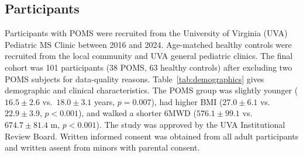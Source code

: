 \documentclass{article}
\begin{document}
\subsection{Participants}\label{sec:participants}

Participants with POMS were recruited from the University of Virginia (UVA) Pediatric MS Clinic between 2016 and 2024. Age-matched healthy controls were recruited from the local community and UVA general pediatric clinics. The final cohort was 101 participants (38 POMS, 63 healthy controls) after excluding two POMS subjects for data-quality reasons. Table~\ref{tab:demographics} gives demographic and clinical characteristics. The POMS group was slightly younger ($16.5 \pm 2.6$ vs.\ $18.0 \pm 3.1$ years, $p = 0.007$), had higher BMI ($27.0 \pm 6.1$ vs.\ $22.9 \pm 3.9$, $p < 0.001$), and walked a shorter 6MWD ($576.1 \pm 99.1$ vs.\ $674.7 \pm 81.4$ m, $p < 0.001$). The study was approved by the UVA Institutional Review Board. Written informed consent was obtained from all adult participants and written assent from minors with parental consent.
\end{document}
